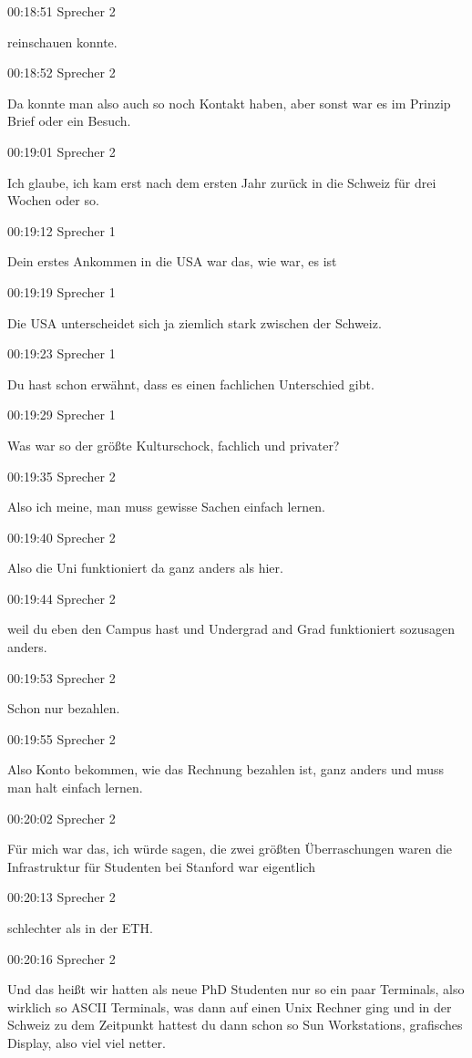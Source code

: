 00:18:51 Sprecher 2

reinschauen konnte.

00:18:52 Sprecher 2

Da konnte man also auch so noch Kontakt haben, aber sonst war es im
Prinzip Brief oder ein Besuch.

00:19:01 Sprecher 2

Ich glaube, ich kam erst nach dem ersten Jahr zurück in die Schweiz für
drei Wochen oder so.

00:19:12 Sprecher 1

Dein erstes Ankommen in die USA war das, wie war, es ist

00:19:19 Sprecher 1

Die USA unterscheidet sich ja ziemlich stark zwischen der Schweiz.

00:19:23 Sprecher 1

Du hast schon erwähnt, dass es einen fachlichen Unterschied gibt.

00:19:29 Sprecher 1

Was war so der größte Kulturschock, fachlich und privater?

00:19:35 Sprecher 2

Also ich meine, man muss gewisse Sachen einfach lernen.

00:19:40 Sprecher 2

Also die Uni funktioniert da ganz anders als hier.

00:19:44 Sprecher 2

weil du eben den Campus hast und Undergrad and Grad funktioniert
sozusagen anders.

00:19:53 Sprecher 2

Schon nur bezahlen.

00:19:55 Sprecher 2

Also Konto bekommen, wie das Rechnung bezahlen ist, ganz anders und muss
man halt einfach lernen.

00:20:02 Sprecher 2

Für mich war das, ich würde sagen, die zwei größten Überraschungen waren
die Infrastruktur für Studenten bei Stanford war eigentlich

00:20:13 Sprecher 2

schlechter als in der ETH.

00:20:16 Sprecher 2

Und das heißt wir hatten als neue PhD Studenten nur so ein paar
Terminals, also wirklich so ASCII Terminals, was dann auf einen Unix
Rechner ging und in der Schweiz zu dem Zeitpunkt hattest du dann schon
so Sun Workstations, grafisches Display, also viel viel netter.

